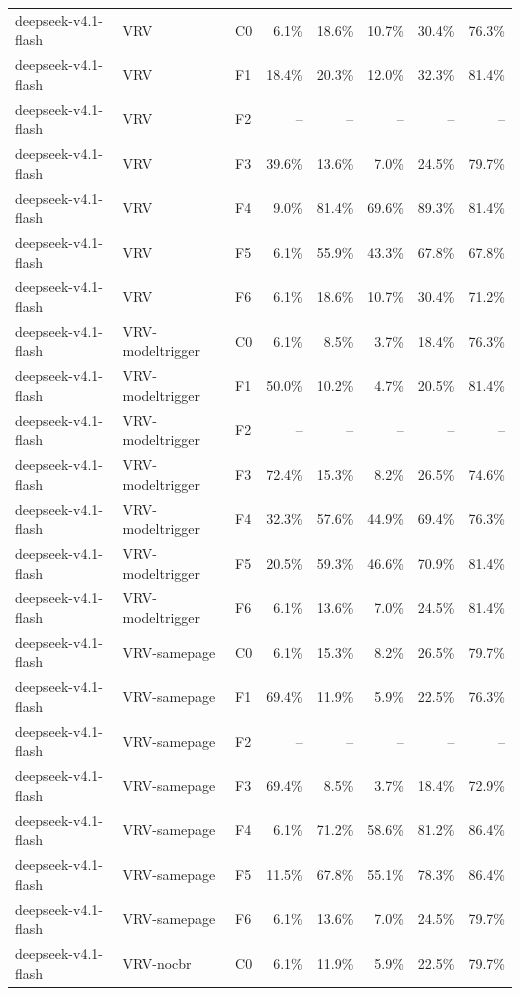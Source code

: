 \begin{tabular}{lllrrrrr}
deepseek-v4.1-flash & VRV & C0 & 6.1\% & 18.6\% & 10.7\% & 30.4\% & 76.3\% \\
deepseek-v4.1-flash & VRV & F1 & 18.4\% & 20.3\% & 12.0\% & 32.3\% & 81.4\% \\
deepseek-v4.1-flash & VRV & F2 & -- & -- & -- & -- & -- \\
deepseek-v4.1-flash & VRV & F3 & 39.6\% & 13.6\% & 7.0\% & 24.5\% & 79.7\% \\
deepseek-v4.1-flash & VRV & F4 & 9.0\% & 81.4\% & 69.6\% & 89.3\% & 81.4\% \\
deepseek-v4.1-flash & VRV & F5 & 6.1\% & 55.9\% & 43.3\% & 67.8\% & 67.8\% \\
deepseek-v4.1-flash & VRV & F6 & 6.1\% & 18.6\% & 10.7\% & 30.4\% & 71.2\% \\
deepseek-v4.1-flash & VRV-modeltrigger & C0 & 6.1\% & 8.5\% & 3.7\% & 18.4\% & 76.3\% \\
deepseek-v4.1-flash & VRV-modeltrigger & F1 & 50.0\% & 10.2\% & 4.7\% & 20.5\% & 81.4\% \\
deepseek-v4.1-flash & VRV-modeltrigger & F2 & -- & -- & -- & -- & -- \\
deepseek-v4.1-flash & VRV-modeltrigger & F3 & 72.4\% & 15.3\% & 8.2\% & 26.5\% & 74.6\% \\
deepseek-v4.1-flash & VRV-modeltrigger & F4 & 32.3\% & 57.6\% & 44.9\% & 69.4\% & 76.3\% \\
deepseek-v4.1-flash & VRV-modeltrigger & F5 & 20.5\% & 59.3\% & 46.6\% & 70.9\% & 81.4\% \\
deepseek-v4.1-flash & VRV-modeltrigger & F6 & 6.1\% & 13.6\% & 7.0\% & 24.5\% & 81.4\% \\
deepseek-v4.1-flash & VRV-samepage & C0 & 6.1\% & 15.3\% & 8.2\% & 26.5\% & 79.7\% \\
deepseek-v4.1-flash & VRV-samepage & F1 & 69.4\% & 11.9\% & 5.9\% & 22.5\% & 76.3\% \\
deepseek-v4.1-flash & VRV-samepage & F2 & -- & -- & -- & -- & -- \\
deepseek-v4.1-flash & VRV-samepage & F3 & 69.4\% & 8.5\% & 3.7\% & 18.4\% & 72.9\% \\
deepseek-v4.1-flash & VRV-samepage & F4 & 6.1\% & 71.2\% & 58.6\% & 81.2\% & 86.4\% \\
deepseek-v4.1-flash & VRV-samepage & F5 & 11.5\% & 67.8\% & 55.1\% & 78.3\% & 86.4\% \\
deepseek-v4.1-flash & VRV-samepage & F6 & 6.1\% & 13.6\% & 7.0\% & 24.5\% & 79.7\% \\
deepseek-v4.1-flash & VRV-nocbr & C0 & 6.1\% & 11.9\% & 5.9\% & 22.5\% & 79.7\% \\

\end{tabular}
